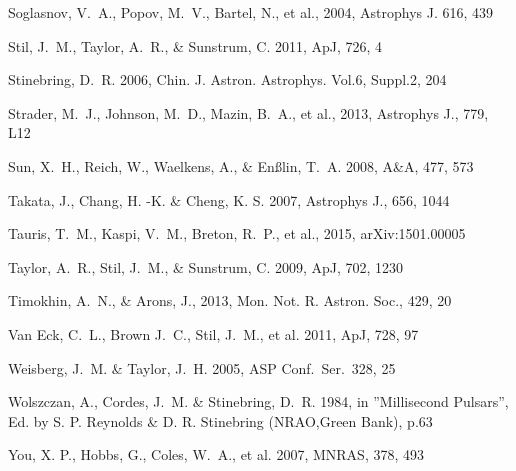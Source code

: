 \begin{thebibliography}{99}
\begin{multicols}{2}
{
Soglasnov, V.~A., Popov, M.~V., Bartel, N., et al., 2004, Astrophys J. 616, 439

Stil, J.~M., Taylor, A.~R., \& Sunstrum, C. 2011, ApJ, 726, 4

Stinebring, D.~R. 2006, Chin. J. Astron. Astrophys. Vol.6, Suppl.2, 204

Strader, M.~J., Johnson, M.~D., Mazin, B.~A., et al., 2013, Astrophys J., 779, L12

Sun, X.~H., Reich, W., Waelkens, A., \& En{}\ss{}lin, T.~A. 2008, A\&A, 477, 573

Takata, J., Chang, H. -K. \& Cheng, K. S. 2007,  Astrophys J., 656, 1044

Tauris, T.~M., Kaspi, V.~M., Breton, R.~P., et al., 2015, arXiv:1501.00005

Taylor, A.~R., Stil, J.~M., \& Sunstrum, C. 2009, ApJ, 702, 1230

Timokhin, A.~N., \& Arons, J., 2013, Mon. Not. R. Astron. Soc., 429, 20

Van Eck, C.~L., Brown J.~C., Stil, J.~M., et al. 2011, ApJ, 728, 97

Weisberg, J.~M. \& Taylor, J.~H. 2005, ASP Conf.\ Ser.\ 328, 25

Wolszczan, A., Cordes, J.~M. \& Stinebring, D.~R. 1984, in ”Millisecond Pulsars”, Ed. by S. P. Reynolds \& D. R. Stinebring (NRAO,Green Bank), p.63

You, X. P., Hobbs, G., Coles, W.~A., et al. 2007, MNRAS, 378, 493


}\end{multicols}
\end{thebibliography}
